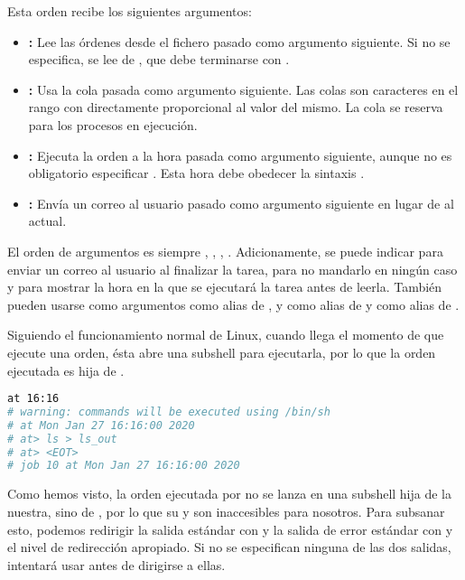 Esta orden recibe los siguientes argumentos:

\begin{itemize}
	\item{}\textbf{:} Lee las órdenes desde el fichero pasado como argumento siguiente. Si no se especifica, se lee de , que debe terminarse con .
	\item{}\textbf{:} Usa la cola pasada como argumento siguiente. Las colas son caracteres en el rango \code{[a-zA-Z]} con  directamente proporcional al valor del mismo. La cola \code{=} se reserva para los procesos en ejecución.
	\item{}\textbf{:} Ejecuta la orden a la hora pasada como argumento siguiente, aunque no es obligatorio especificar . Esta hora debe obedecer la sintaxis .
	\item{}\textbf{:} Envía un correo al usuario pasado como argumento siguiente en lugar de al actual.
\end{itemize}

El orden de argumentos es siempre , , , .
Adicionamente, se puede indicar  para enviar un correo al usuario al finalizar la tarea,  para no mandarlo en ningún caso y  para mostrar la hora en la que se ejecutará la tarea antes de leerla.
También pueden usarse como argumentos  como alias de ,  y  como alias de  y  como alias de .

Siguiendo el funcionamiento normal de Linux, cuando llega el momento de que  ejecute una orden, ésta abre una subshell  para ejecutarla, por lo que la orden ejecutada es hija de .

\begin{lstlisting}[language=Bash]
at 16:16
# warning: commands will be executed using /bin/sh
# at Mon Jan 27 16:16:00 2020
# at> ls > ls_out
# at> <EOT>
# job 10 at Mon Jan 27 16:16:00 2020
\end{lstlisting}

Como hemos visto, la orden ejecutada por  no se lanza en una subshell hija de la nuestra, sino de , por lo que su  y  son inaccesibles para nosotros.
Para subsanar esto, podemos redirigir la salida estándar con  y la salida de error estándar con  y el nivel de redirección apropiado.
Si no se especifican ninguna de las dos salidas,  intentará usar  antes de dirigirse a ellas.

